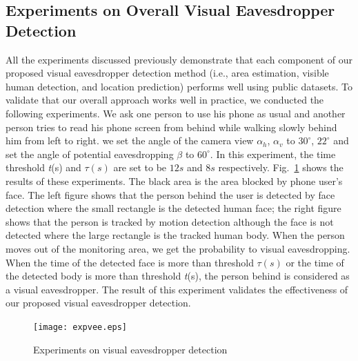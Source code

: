 \subsection{Experiments on Overall Visual Eavesdropper Detection}
All the experiments discussed previously demonstrate that each component of our proposed visual eavesdropper detection method (i.e., area estimation, visible human detection,  and location prediction)  performs well using public datasets.  To validate that our overall approach works well in practice, we conducted the following experiments. We ask one person to use his phone as usual and another person tries to read his phone screen from behind while walking slowly behind him from left to right.
we set the angle of the camera view $\alpha_h$, $\alpha_v$ to $ 30^\circ $, $ 22^\circ $ and set the angle of potential eavesdropping $\beta$ to $ 60^\circ $. In this experiment, the time threshold \textit{t}(s) and $\tau(s)$  %
are set to be $12s$ and $8s$ respectively.  Fig.~\ref{fig:all-results} shows the results of these experiments.
The black area is the area blocked by phone user's face. The left figure shows  that the person behind the user is detected by face detection where the small rectangle is the detected human face; the right figure shows that the person is tracked by motion detection although the face is not detected where the large rectangle is the tracked human body. When the person moves out of the monitoring area, we get the probability to visual eavesdropping. When the time of the detected face is more than  threshold $\tau(s)$ or the time of the detected body is more than  threshold \textit{t}(s), the person behind is considered as a visual eavesdropper. The result of this experiment validates the effectiveness of our proposed visual eavesdropper detection.
\begin{figure}[H]
\centering
\texttt{[image: expvee.eps]}
\caption{Experiments on visual eavesdropper detection }
\label{fig:all-results}
\end{figure}


